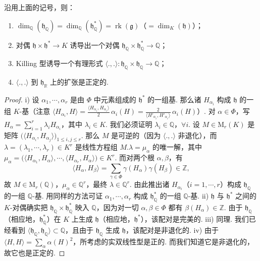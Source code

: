 \begin{proposition*}
沿用上面的记号，则：
\begin{enumerate}[label=\roman*)]
\item $\dim_{\mathbb Q}(\mathfrak h_{\mathbb Q})=\dim_{\mathbb Q}(\mathfrak h^{*}_{\mathbb Q})=\operatorname{rk}(\mathfrak g)$（$=\dim_{K}(\mathfrak h)$）；
\item 对偶 $\mathfrak h\times\mathfrak h^{*}\longrightarrow K$ 诱导出一个对偶 $\mathfrak h_{\mathbb Q}\times\mathfrak h^{*}_{\mathbb Q}\longrightarrow\mathbb Q$；
\item Killing 型诱导一个有理形式 $\langle.,.\rangle:\mathfrak h_{\mathbb Q}\times\mathfrak h_{\mathbb Q}\longrightarrow\mathbb Q$；
\item $\langle.,.\rangle$ 到 $\mathfrak h_{\mathbb R}$ 上的扩张是正定的.
\end{enumerate}
\end{proposition*}
\begin{proof}
i) 设 $\alpha_{1},\cdots,\alpha_{r}$ 是由 $\Phi$ 中元素组成的 $\mathfrak h^{*}$ 的一组基. 那么诸 $H_{\alpha_{i}}$ 构成 $\mathfrak h$ 的一组 $K$-基（注意 $\langle H_{\alpha_{i}},H\rangle=\frac{\langle H_{\alpha_{i}},H_{\alpha_{i}}\rangle}{2}\,\alpha_{i}(H)=\frac{2}{\langle H'_{\alpha_{i}},H'_{\alpha_{i}}\rangle}\,\alpha_{i}(H)$）. 对 $\alpha\in\Phi$，写 $H_{\alpha}=\sum_{i=1}^{r}\lambda_{i}H_{\alpha_{i}}$，其中 $\lambda_{i}\in K$. 我们必须证明 $\lambda_{i}\in\mathbb Q$，$\forall i$. 设 $M\in\mathrm M_{r}(K)$ 是矩阵 $\bigl(\langle H_{\alpha_{i}},H_{\alpha_{j}}\rangle\bigr)_{1\leqslant i,j\leqslant r}$. 那么 $M$ 是可逆的（因为 $\langle.,.\rangle$ 非退化），而 $\lambda=(\lambda_{1},\cdots,\lambda_{r})\in K^{r}$ 是线性方程组 $M.\lambda=\mu_{\alpha}$ 的唯一解，其中 $\mu_{\alpha}=\bigl(\langle H_{\alpha_{1}},H_{\alpha}\rangle,\cdots,\langle H_{\alpha_{r}},H_{\alpha}\rangle\bigr)\in K^{r}$. 而对两个根 $\alpha,\beta$，有
\[
\langle H_{\alpha},H_{\beta}\rangle=\sum_{\gamma\in\Phi}\gamma(H_{\alpha})\gamma(H_{\beta})\in\mathbb Z,
\]
故 $M\in\mathrm M_{r}(\mathbb Q)$，$\mu_{\alpha}\in\mathbb Q^{r}$，最终 $\lambda\in\mathbb Q^{r}$. 由此推出诸 $H_{\alpha_{i}}$（$i=1,\cdots,r$）构成 $\mathfrak h_{\mathbb Q}$ 的一组 $\mathbb Q$-基. 用同样的方法可证 $\alpha_{1},\cdots,\alpha_{r}$ 构成 $\mathfrak h^{*}_{\mathbb Q}$ 的一组 $\mathbb Q$-基.
ii) $\mathfrak h$ 与 $\mathfrak h^{*}$ 之间的 $K$-对偶确实把 $\mathfrak h_{\mathbb Q}\times\mathfrak h^{*}_{\mathbb Q}$ 映入 $\mathbb Q$，因为对一切 $\alpha,\beta\in\Phi$ 都有 $\beta(H_{\alpha})\in\mathbb Z$. 由于 $\mathfrak h_{\mathbb Q}$（相应地，$\mathfrak h^{*}_{\mathbb Q}$）在 $K$ 上生成 $\mathfrak h$（相应地，$\mathfrak h^{*}$），该配对是完美的.
iii) 同理. 我们已经看到 $\langle\mathfrak h_{\mathbb Q},\mathfrak h_{\mathbb Q}\rangle\subset\mathbb Q$，且由于 $\mathfrak h_{\mathbb Q}$ 生成 $\mathfrak h$，该配对是非退化的.
iv) 由于 $\langle H,H\rangle=\sum_{\alpha}\alpha(H)^{2}$，所考虑的实双线性型是正的. 而我们知道它是非退化的，故它也是正定的.
\end{proof}
